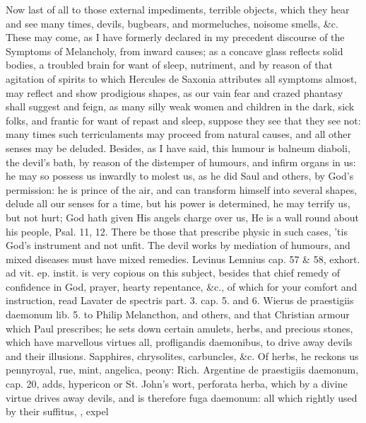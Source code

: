 {Now last of all to those external impediments, terrible objects, which
they hear and see many times, devils, bugbears, and mormeluches,
noisome smells, \&c. These may come, as I have formerly declared in my
precedent discourse of the Symptoms of Melancholy, from inward causes;
as a concave glass reflects solid bodies, a troubled brain for want of
sleep, nutriment, and by reason of that agitation of spirits to which
Hercules de Saxonia attributes all symptoms almost, may reflect and
show prodigious shapes, as our vain fear and crazed phantasy shall
suggest and feign, as many silly weak women and children in the dark,
sick folks, and frantic for want of repast and sleep, suppose they see
that they see not: many times such terriculaments may proceed from
natural causes, and all other senses may be deluded. Besides, as I have
said, this humour is balneum diaboli, the devil's bath, by reason of
the distemper of humours, and infirm organs in us: he may so possess us
inwardly to molest us, as he did Saul and others, by God's permission:
he is prince of the air, and can transform himself into several shapes,
delude all our senses for a time, but his power is determined, he may
terrify us, but not hurt; God hath given His angels charge over us, He
is a wall round about his people, Psal.  11, 12. There be those
that prescribe physic in such cases, 'tis God's instrument and not
unfit. The devil works by mediation of humours, and mixed diseases must
have mixed remedies. Levinus Lemnius cap. 57 \& 58, exhort. \textlatin{ad vit. ep.
instit.} is very copious on this subject, besides that chief remedy of
confidence in God, prayer, hearty repentance, \&c., of which for your
comfort and instruction, read Lavater \textlatin{de spectris part. 3. cap. 5. and
6. Wierus de praestigiis daemonum lib. 5.} to Philip Melancthon, and
others, and that Christian armour which Paul prescribes; he sets down
certain amulets, herbs, and precious stones, which have marvellous
virtues all, profligandis daemonibus, to drive away devils and their
illusions. Sapphires, chrysolites, carbuncles, \&c.  Of herbs, he reckons us pennyroyal,
rue, mint, angelica, peony: Rich. Argentine de praestigiis daemonum,
cap. 20, adds, hypericon or St. John's wort, perforata herba, which by
a divine virtue drives away devils, and is therefore fuga daemonum: all
which rightly used by their suffitus, , expel
}
